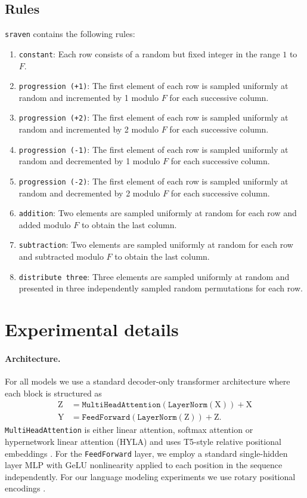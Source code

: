 \documentclass{article} \usepackage{iclr2025,times}
\begin{document}
\subsection{Rules}
\label{appsec:sraven-rules}
\texttt{sraven} contains the following rules:
\begin{enumerate}[leftmargin=*]
    \item \texttt{constant}: Each row consists of a random but fixed integer in the range $1$ to $F$.
    \item \texttt{progression (+1)}: The first element of each row is sampled uniformly at random and incremented by 1 modulo $F$ for each successive column.
    \item \texttt{progression (+2)}: The first element of each row is sampled uniformly at random and incremented by 2 modulo $F$ for each successive column.
    \item \texttt{progression (-1)}: The first element of each row is sampled uniformly at random and decremented by 1 modulo $F$ for each successive column.
    \item \texttt{progression (-2)}: The first element of each row is sampled uniformly at random and decremented by 2 modulo $F$ for each successive column.
    \item \texttt{addition}: Two elements are sampled uniformly at random for each row and added modulo $F$ to obtain the last column.
    \item \texttt{subtraction}: Two elements are sampled uniformly at random for each row and subtracted modulo $F$ to obtain the last column.
    \item \texttt{distribute three}: Three elements are sampled uniformly at random and presented in three independently sampled random permutations for each row.
\end{enumerate}

\clearpage

\section{Experimental details}
\label{appsec:experimental-details}
\paragraph{Architecture.}
For all models we use a standard decoder-only transformer architecture where each block is structured as
\begin{align*}
    \bm{\mathrm{Z}} &= \texttt{MultiHeadAttention}(\texttt{LayerNorm}(\bm{\mathrm{X}})) + \bm{\mathrm{X}} \\
    \bm{\mathrm{Y}} &= \texttt{FeedForward}(\texttt{LayerNorm}(\bm{\mathrm{Z}})) + \bm{\mathrm{Z}}.
\end{align*}
\texttt{MultiHeadAttention} is either linear attention, softmax attention or hypernetwork linear attention (HYLA) and uses T5-style relative positional embeddings \citep{raffel_exploring_2020}.
For the \texttt{FeedForward} layer, we employ a standard single-hidden layer MLP with GeLU nonlinearity applied to each position in the sequence independently.
For our language modeling experiments we use rotary positional encodings \citep{su_roformer_2024}.
\end{document}
